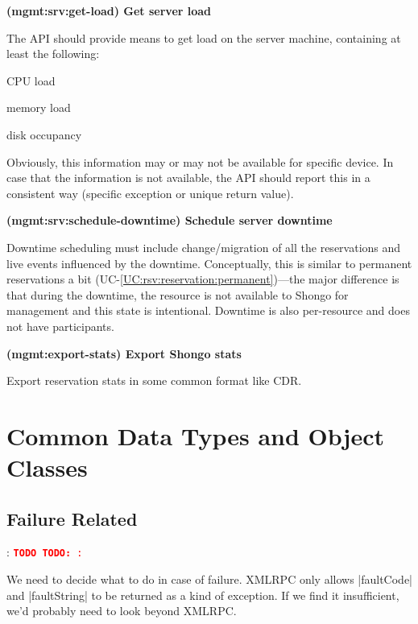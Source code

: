 \documentclass[a4paper]{report}
\makeatletter
\newcounter{UCcounter}
\newenvironment{UseCases}%
	{\begin{list}{\textbf{UC-\arabic{UCcounter}}}{\@nmbrlisttrue\def\@listctr{UCcounter}}}%
	{\end{list}}
\newcommand{\UClabel}[1]{\label{UC:#1}}
\newcommand{\UCref}[1]{UC-\ref{UC:#1}}
\newcommand{\UseCase}[2]{\item\UClabel{#2} \textbf{(#2) #1}\\ \nopagebreak}
\newcommand{\TODO}[1]{%
\def\empty{}%
\def\prvniparametr{#1}%
\ifx\prvniparametr\empty%
\begingroup\tt\textcolor{red}{\noindent\textbf{TODO}}\endgroup
\else%
\begingroup\tt\textcolor{red}{\noindent\textbf{TODO:}\ #1}\endgroup
\fi%
}
\makeatother
\begin{document}
\begin{UseCases}

\UseCase{Get server load}{mgmt:srv:get-load}

The API should provide means to get load on the server machine, containing at
least the following:

\begin{compactitem}

\item CPU load

\item memory load

\item disk occupancy

\end{compactitem}

Obviously, this information may or may not be available for specific device.
In case that the information is not available, the API should report this in a
consistent way (specific exception or unique return value).


\UseCase{Schedule server downtime}{mgmt:srv:schedule-downtime}

Downtime scheduling must include change/migration of all the reservations and
live events influenced by the downtime. Conceptually, this is similar to
permanent reservations a bit (\UCref{rsv:reservation:permanent})---the major
difference is that during the downtime, the resource is not available to Shongo
for management and this state is intentional. Downtime is also per-resource and
does not have participants.

\UseCase{Export Shongo stats}{mgmt:export-stats}

Export reservation stats in some common format like CDR.

\end{UseCases}




\chapter{Common Data Types and Object Classes}

\section{Failure Related}

\TODO{:}
We need to decide what to do in case of failure. XMLRPC only allows |faultCode| and |faultString| to be returned as a kind of exception. If we find it insufficient, we'd probably need to look beyond XMLRPC.
\end{document}

